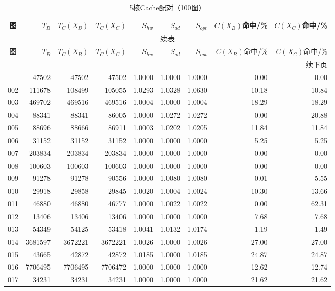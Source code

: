 \begin{longtable}{crrrrrrrr}
\caption{5核Cache配对（100图）}\label{tab:cache-detail-5}\\
\toprule
图 & $T_B$ & $T_C(X_B)$ & $T_C(X_C)$ & $S_{hw}$ & $S_{ad}$ & $S_{opt}$ & $C(X_B)$命中/\% & $C(X_C)$命中/\% \\
\midrule
\endfirsthead
\multicolumn{9}{c}{续表}\\
\toprule
图 & $T_B$ & $T_C(X_B)$ & $T_C(X_C)$ & $S_{hw}$ & $S_{ad}$ & $S_{opt}$ & $C(X_B)$命中/\% & $C(X_C)$命中/\% \\
\midrule
\endhead
\midrule\multicolumn{9}{r}{续下页}\\
\endfoot
\bottomrule
\endlastfoot
001 & 47502 & 47502 & 47502 & 1.0000 & 1.0000 & 1.0000 & 0.00 & 0.00 \\
002 & 111678 & 108499 & 105055 & 1.0293 & 1.0328 & 1.0630 & 10.18 & 10.84 \\
003 & 469702 & 469516 & 469516 & 1.0004 & 1.0000 & 1.0004 & 18.29 & 18.29 \\
004 & 88341 & 88341 & 86005 & 1.0000 & 1.0272 & 1.0272 & 0.00 & 20.88 \\
005 & 88696 & 88666 & 86911 & 1.0003 & 1.0202 & 1.0205 & 11.84 & 11.84 \\
006 & 31152 & 31152 & 31152 & 1.0000 & 1.0000 & 1.0000 & 5.25 & 5.25 \\
007 & 203834 & 203834 & 203834 & 1.0000 & 1.0000 & 1.0000 & 0.00 & 0.00 \\
008 & 100603 & 100603 & 100603 & 1.0000 & 1.0000 & 1.0000 & 0.00 & 0.00 \\
009 & 91278 & 91278 & 90556 & 1.0000 & 1.0080 & 1.0080 & 0.01 & 5.55 \\
010 & 29918 & 29858 & 29845 & 1.0020 & 1.0004 & 1.0024 & 10.30 & 13.66 \\
011 & 46880 & 46880 & 46777 & 1.0000 & 1.0022 & 1.0022 & 0.00 & 62.31 \\
012 & 13406 & 13406 & 13406 & 1.0000 & 1.0000 & 1.0000 & 7.68 & 7.68 \\
013 & 54349 & 54125 & 53418 & 1.0041 & 1.0132 & 1.0174 & 1.19 & 1.49 \\
014 & 3681597 & 3672221 & 3672221 & 1.0026 & 1.0000 & 1.0026 & 27.00 & 27.00 \\
015 & 43665 & 42872 & 42872 & 1.0185 & 1.0000 & 1.0185 & 24.87 & 24.87 \\
016 & 7706495 & 7706495 & 7706472 & 1.0000 & 1.0000 & 1.0000 & 12.62 & 12.74 \\
017 & 34231 & 34231 & 34231 & 1.0000 & 1.0000 & 1.0000 & 21.62 & 21.62 \\

\end{longtable}
